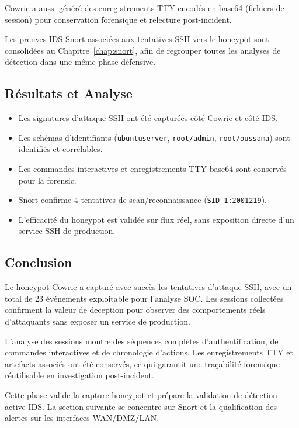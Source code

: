 \documentclass[12pt,a4paper,openany]{report}
\begin{document}
	Cowrie a aussi généré des enregistrements TTY encodés en base64 (fichiers de session) pour conservation forensique et relecture post-incident.
	
	Les preuves IDS Snort associées aux tentatives SSH vers le honeypot sont consolidées au Chapitre~\ref{chap:snort}, afin de regrouper toutes les analyses de détection dans une même phase défensive.
	
	\subsection{Résultats et Analyse}
	
	\begin{itemize}
		\item Les signatures d'attaque SSH ont été capturées côté Cowrie et côté IDS.
		\item Les schémas d'identifiants (\texttt{ubuntuserver}, \texttt{root/admin}, \texttt{root/oussama}) sont identifiés et corrélables.
		\item Les commandes interactives et enregistrements TTY base64 sont conservés pour la forensic.
		\item Snort confirme 4 tentatives de scan/reconnaissance (\texttt{SID 1:2001219}).
		\item L'efficacité du honeypot est validée sur flux réel, sans exposition directe d'un service SSH de production.
	\end{itemize}
	
	\subsection{Conclusion}
	
	Le honeypot Cowrie a capturé avec succès les tentatives d'attaque SSH, avec un total de 23 événements exploitable pour l'analyse SOC. Les sessions collectées confirment la valeur de deception pour observer des comportements réels d'attaquants sans exposer un service de production.
	
	L'analyse des sessions montre des séquences complètes d'authentification, de commandes interactives et de chronologie d'actions. Les enregistrements TTY et artefacts associés ont été conservés, ce qui garantit une traçabilité forensique réutilisable en investigation post-incident.
	
	Cette phase valide la capture honeypot et prépare la validation de détection active IDS. La section suivante se concentre sur Snort et la qualification des alertes sur les interfaces WAN/DMZ/LAN.
	
\end{document}

